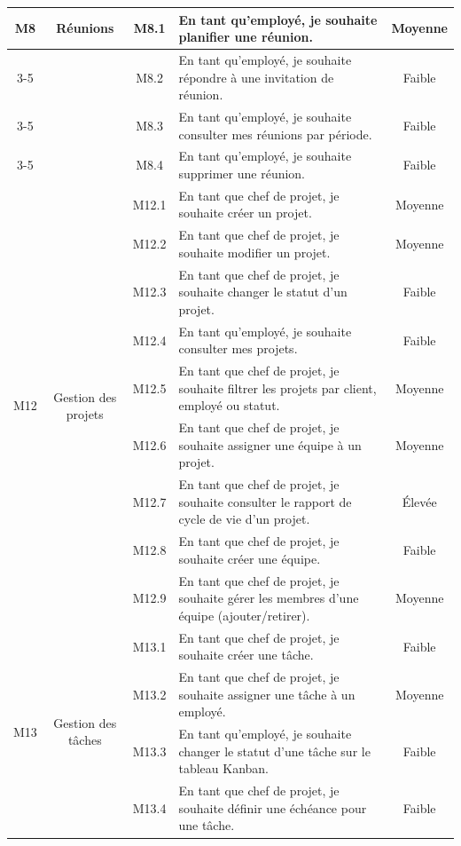 \begin{longtable}{|c|c|c|p{7.2cm}|c|}
\multirow{4}{*}{M8} & \multirow{4}{*}{Réunions} & M8.1 & En tant qu'employé, je souhaite planifier une réunion. & Moyenne \\
\cline{3-5}
 & & M8.2 & En tant qu'employé, je souhaite répondre à une invitation de réunion. & Faible \\
\cline{3-5}
 & & M8.3 & En tant qu'employé, je souhaite consulter mes réunions par période. & Faible \\
\cline{3-5}
 & & M8.4 & En tant qu'employé, je souhaite supprimer une réunion. & Faible \\
\hline
\multirow{9}{*}{M12} & \multirow{9}{*}{Gestion des projets} & M12.1 & En tant que chef de projet, je souhaite créer un projet. & Moyenne \\
\cline{3-5}
 & & M12.2 & En tant que chef de projet, je souhaite modifier un projet. & Moyenne \\
\cline{3-5}
 & & M12.3 & En tant que chef de projet, je souhaite changer le statut d'un projet. & Faible \\
\cline{3-5}
 & & M12.4 & En tant qu'employé, je souhaite consulter mes projets. & Faible \\
\cline{3-5}
 & & M12.5 & En tant que chef de projet, je souhaite filtrer les projets par client, employé ou statut. & Moyenne \\
\cline{3-5}
 & & M12.6 & En tant que chef de projet, je souhaite assigner une équipe à un projet. & Moyenne \\
\cline{3-5}
 & & M12.7 & En tant que chef de projet, je souhaite consulter le rapport de cycle de vie d'un projet. & Élevée \\
\cline{3-5}
 & & M12.8 & En tant que chef de projet, je souhaite créer une équipe. & Faible \\
\cline{3-5}
 & & M12.9 & En tant que chef de projet, je souhaite gérer les membres d'une équipe (ajouter/retirer). & Moyenne \\
\hline
\multirow{7}{*}{M13} & \multirow{7}{*}{Gestion des tâches} & M13.1 & En tant que chef de projet, je souhaite créer une tâche. & Faible \\
\cline{3-5}
 & & M13.2 & En tant que chef de projet, je souhaite assigner une tâche à un employé. & Moyenne \\
\cline{3-5}
 & & M13.3 & En tant qu'employé, je souhaite changer le statut d'une tâche sur le tableau Kanban. & Faible \\
\cline{3-5}
 & & M13.4 & En tant que chef de projet, je souhaite définir une échéance pour une tâche. & Faible \\

\end{longtable}
